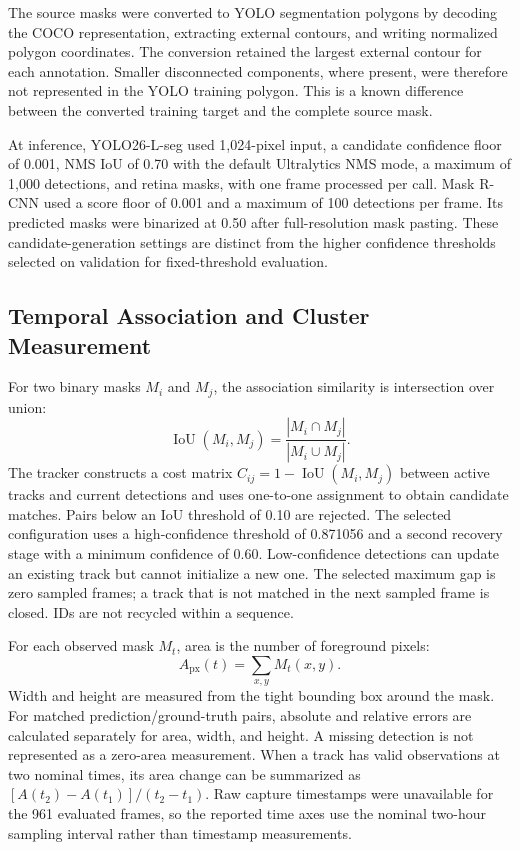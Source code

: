 \documentclass[11pt,a4paper]{article}
\begin{document}
The source masks were converted to YOLO segmentation polygons by decoding the COCO representation, extracting external contours, and writing normalized polygon coordinates. The conversion retained the largest external contour for each annotation. Smaller disconnected components, where present, were therefore not represented in the YOLO training polygon. This is a known difference between the converted training target and the complete source mask.

At inference, YOLO26-L-seg used 1,024-pixel input, a candidate confidence floor of 0.001, NMS IoU of 0.70 with the default Ultralytics NMS mode, a maximum of 1,000 detections, and retina masks, with one frame processed per call. Mask R-CNN used a score floor of 0.001 and a maximum of 100 detections per frame. Its predicted masks were binarized at 0.50 after full-resolution mask pasting. These candidate-generation settings are distinct from the higher confidence thresholds selected on validation for fixed-threshold evaluation.

\subsection{Temporal Association and Cluster Measurement}

For two binary masks $M_i$ and $M_j$, the association similarity is intersection over union:
\begin{equation}
\operatorname{IoU}(M_i,M_j)=\frac{|M_i\cap M_j|}{|M_i\cup M_j|}.
\end{equation}
The tracker constructs a cost matrix $C_{ij}=1-\operatorname{IoU}(M_i,M_j)$ between active tracks and current detections and uses one-to-one assignment to obtain candidate matches. Pairs below an IoU threshold of 0.10 are rejected. The selected configuration uses a high-confidence threshold of 0.871056 and a second recovery stage with a minimum confidence of 0.60. Low-confidence detections can update an existing track but cannot initialize a new one. The selected maximum gap is zero sampled frames; a track that is not matched in the next sampled frame is closed. IDs are not recycled within a sequence.

For each observed mask $M_t$, area is the number of foreground pixels:
\begin{equation}
A_{\mathrm{px}}(t)=\sum_{x,y}M_t(x,y).
\end{equation}
Width and height are measured from the tight bounding box around the mask. For matched prediction/ground-truth pairs, absolute and relative errors are calculated separately for area, width, and height. A missing detection is not represented as a zero-area measurement. When a track has valid observations at two nominal times, its area change can be summarized as $[A(t_2)-A(t_1)]/(t_2-t_1)$. Raw capture timestamps were unavailable for the 961 evaluated frames, so the reported time axes use the nominal two-hour sampling interval rather than timestamp measurements.
\end{document}

